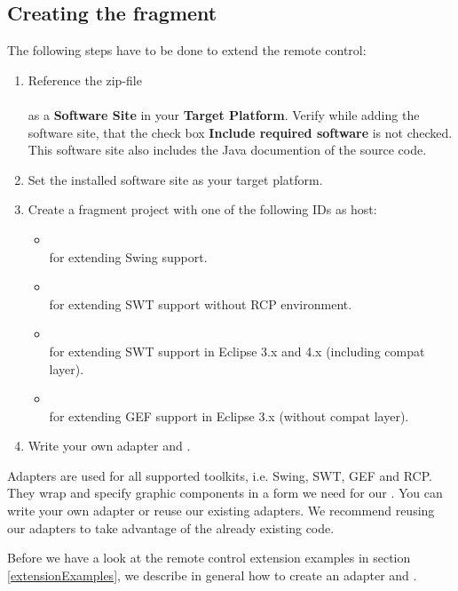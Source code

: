 \subsection{Creating the fragment}

The following steps have to be done to extend the remote control:

\begin{enumerate}
  \item Reference the zip-file\\
        \\
        as a \textbf{Software Site} in your \textbf{Target Platform}.
        Verify while adding the software site, that the check box
        \textbf{Include required software} is not checked. This software site also
        includes the Java documention of the source code.
  \item Set the installed software site as your target platform.
  \item Create a fragment project with one of the following IDs as host:
    \begin{itemize}
      \item {}\\
            for extending Swing support.
      \item {}\\
            for extending SWT support without RCP environment.
      \item {}\\
            for extending SWT support in Eclipse 3.x and 4.x (including compat
            layer).
      \item {}\\
            for extending GEF support in Eclipse 3.x (without compat
            layer).
   \end{itemize}
  \item Write your own adapter and \gdtesterclasses.
\end{enumerate}

Adapters are used for all supported toolkits, i.e. Swing, SWT, GEF and RCP.
They wrap and specify graphic components in a form we need for our
\gdtesterclasses. You can write your own adapter or reuse our existing
adapters. We recommend reusing our adapters to take advantage of the already
existing code.

Before we have a look at the remote control extension examples in section
\ref{extensionExamples}, we describe in general how to create an
adapter and \gdtesterclasses.


